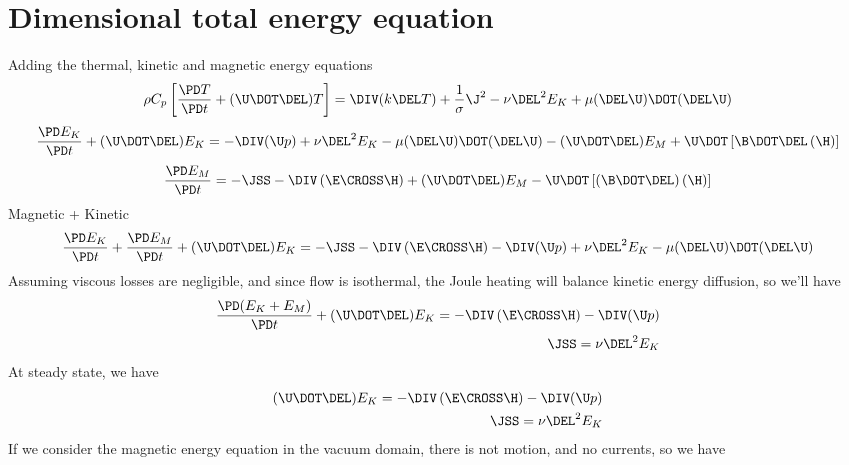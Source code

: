\documentclass[11pt]{article}
\begin{document}
\doublespacing
\MOONSTITLE
\maketitle

\section{Dimensional total energy equation}
Adding the thermal, kinetic and magnetic energy equations
\begin{equation}
	\rho C_p \left[ \frac{\PD T}{\PD t}
	+ (\U \DOT \DEL) T \right]
	= \DIV (k \DEL T)
	+ \frac{1}{\sigma} \J^2
	- \nu \DEL^2 E_K
	+ \mu (\DEL \U) \DOT (\DEL \U)
\end{equation}
\begin{equation}
	\frac{\PD E_K}{\PD t} +
	(\U \DOT \DEL) E_K =
	- \DIV (\U p)
	+ \nu \DEL^2 E_K
	- \mu (\DEL \U) \DOT (\DEL \U)
	- (\U \DOT \DEL) E_M
	+ \U \DOT \left[\B \DOT \DEL \left( \H \right) \right]
\end{equation}
\begin{equation}
	\frac{\PD E_M}{\PD t} =
	- \JSS
	- \DIV \left(\E \CROSS \H \right)
	+ (\U \DOT \DEL) E_M
	- \U \DOT \left[(\B \DOT \DEL) \left( \H \right) \right]
\end{equation}
Magnetic + Kinetic
\begin{equation}
	\frac{\PD E_K}{\PD t}
	+ \frac{\PD E_M}{\PD t}
	+ (\U \DOT \DEL) E_K =
	- \JSS
	- \DIV \left(\E \CROSS \H \right)
	- \DIV (\U p)
	+ \nu \DEL^2 E_K
	- \mu (\DEL \U) \DOT (\DEL \U)
\end{equation}
Assuming viscous losses are negligible, and since flow is isothermal, the Joule heating will balance kinetic energy diffusion, so we'll have
\begin{equation}\begin{aligned}
	\frac{\PD (E_K + E_M)}{\PD t}
	+ (\U \DOT \DEL) E_K =
	- \DIV \left(\E \CROSS \H \right)
	- \DIV (\U p) \\
	\JSS = \nu \DEL^2 E_K
\end{aligned}\end{equation}
At steady state, we have
\begin{equation}\begin{aligned}
	(\U \DOT \DEL) E_K =
	- \DIV \left(\E \CROSS \H \right)
	- \DIV (\U p) \\
	\JSS = \nu \DEL^2 E_K
\end{aligned}\end{equation}
If we consider the magnetic energy equation in the vacuum domain, there is not motion, and no currents, so we have
\end{document}
